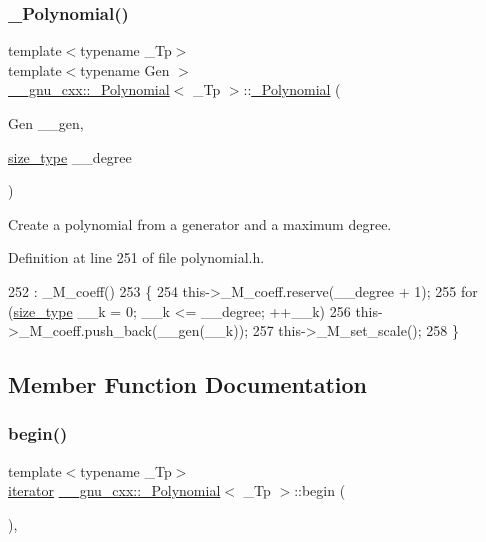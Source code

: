 \subsubsection{\texorpdfstring{\+\_\+\+Polynomial()}{\_Polynomial()}\hspace{0.1cm}{\footnotesize\ttfamily [9/9]}}
{\footnotesize\ttfamily template$<$typename \+\_\+\+Tp$>$ \\
template$<$typename Gen $>$ \\
\hyperlink{class____gnu__cxx_1_1__Polynomial}{\+\_\+\+\_\+gnu\+\_\+cxx\+::\+\_\+\+Polynomial}$<$ \+\_\+\+Tp $>$\+::\hyperlink{class____gnu__cxx_1_1__Polynomial}{\+\_\+\+Polynomial} (\begin{DoxyParamCaption}\item[{Gen}]{\+\_\+\+\_\+gen,  }\item[{\hyperlink{class____gnu__cxx_1_1__Polynomial_a8b25fcfd4acaad0c5c08b649c22da28a}{size\+\_\+type}}]{\+\_\+\+\_\+degree }\end{DoxyParamCaption})\hspace{0.3cm}{\ttfamily [inline]}}

Create a polynomial from a generator and a maximum degree. 

Definition at line 251 of file polynomial.\+h.


\begin{DoxyCode}
252         : \_M\_coeff()
253         \{
254           this->\_M\_coeff.reserve(\_\_degree + 1);
255           \textcolor{keywordflow}{for} (\hyperlink{class____gnu__cxx_1_1__Polynomial_a8b25fcfd4acaad0c5c08b649c22da28a}{size\_type} \_\_k = 0; \_\_k <= \_\_degree; ++\_\_k)
256             this->\_M\_coeff.push\_back(\_\_gen(\_\_k));
257           this->\_M\_set\_scale();
258         \}
\end{DoxyCode}


\subsection{Member Function Documentation}
\mbox{\label{class____gnu__cxx_1_1__Polynomial_a2f9cf484724c2aef472975fc3d8bd99d}} 
\subsubsection{\texorpdfstring{begin()}{begin()}\hspace{0.1cm}{\footnotesize\ttfamily [1/2]}}
{\footnotesize\ttfamily template$<$typename \+\_\+\+Tp$>$ \\
\hyperlink{class____gnu__cxx_1_1__Polynomial_a64bd557b6af46992e352dbe9e30fa201}{iterator} \hyperlink{class____gnu__cxx_1_1__Polynomial}{\+\_\+\+\_\+gnu\+\_\+cxx\+::\+\_\+\+Polynomial}$<$ \+\_\+\+Tp $>$\+::begin (\begin{DoxyParamCaption}{ }\end{DoxyParamCaption})\hspace{0.3cm}{\ttfamily [inline]}, {\ttfamily [noexcept]}}

